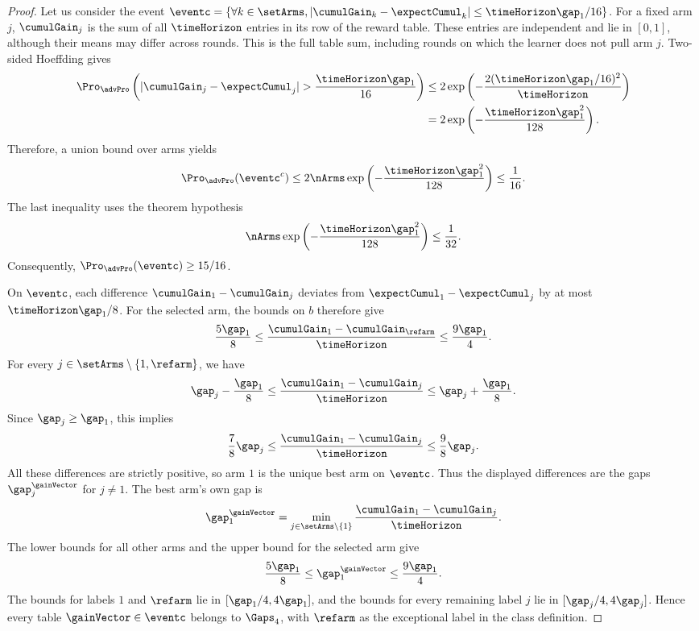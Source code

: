 \begin{proof}
	Let us consider the event
	$\eventc =\left\{ \forall k\in\setArms,  |\cumulGain_k-\expectCumul_{k}| \leq  \timeHorizon \gap_1/16 \right\}
	$.
For a fixed arm $j$, $\cumulGain_j$ is the sum of all $\timeHorizon$
entries in its row of the reward table. These entries are independent
and lie in $[0,1]$, although their means may differ across rounds.
This is the full table sum, including rounds on which the learner
does not pull arm $j$. Two-sided Hoeffding gives
\begin{align*}
\Pro_{\advPro}\left(
|\cumulGain_j-\expectCumul_j|>\frac{\timeHorizon\gap_1}{16}\right)
&\leq2\exp\left(-\frac{2(\timeHorizon\gap_1/16)^2}{\timeHorizon}\right)\\
&=2\exp\left(-\frac{\timeHorizon\gap_1^2}{128}\right).
\end{align*}
Therefore, a union bound over arms yields
\begin{equation}\label{eq:goodEventBOB}
\Pro_{\advPro}(\eventc^c)
\leq2\nArms\exp\left(-\frac{\timeHorizon\gap_1^2}{128}\right)
\leq\frac{1}{16}.
\end{equation}
The last inequality uses the theorem hypothesis
\[
\nArms\exp\left(-\frac{\timeHorizon\gap_1^2}{128}\right)\leq\frac{1}{32}.
\]
Consequently, $\Pro_{\advPro}(\eventc)\geq15/16$.

On $\eventc$, each difference $\cumulGain_1-\cumulGain_j$
deviates from $\expectCumul_1-\expectCumul_j$ by at most
$\timeHorizon\gap_1/8$.
For the selected arm, the bounds on $b$ therefore give
\[
\frac{5\gap_1}{8}
\leq\frac{\cumulGain_1-\cumulGain_{\refarm}}{\timeHorizon}
\leq\frac{9\gap_1}{4}.
\]
For every $j\in\setArms\setminus\{1,\refarm\}$, we have
\[
\gap_j-\frac{\gap_1}{8}
\leq\frac{\cumulGain_1-\cumulGain_j}{\timeHorizon}
\leq\gap_j+\frac{\gap_1}{8}.
\]
Since $\gap_j\geq\gap_1$, this implies
\[
\frac78\gap_j
\leq\frac{\cumulGain_1-\cumulGain_j}{\timeHorizon}
\leq\frac98\gap_j.
\]
All these differences are strictly positive, so arm $1$ is the
unique best arm on $\eventc$. Thus the displayed differences are
the gaps $\gap_j^{\gainVector}$ for $j\neq1$.
The best arm's own gap is
\[
\gap_1^{\gainVector}
=\min_{j\in\setArms\setminus\{1\}}
\frac{\cumulGain_1-\cumulGain_j}{\timeHorizon}.
\]
The lower bounds for all other arms and the upper bound for the
selected arm give
\[
\frac{5\gap_1}{8}\leq\gap_1^{\gainVector}\leq\frac{9\gap_1}{4}.
\]
The bounds for labels $1$ and $\refarm$ lie in
$[\gap_1/4,4\gap_1]$, and the bounds for every remaining label $j$
lie in $[\gap_j/4,4\gap_j]$.
Hence every table $\gainVector\in\eventc$ belongs to $\Gaps_4$,
with $\refarm$ as the exceptional label in the class definition.


\end{proof}
